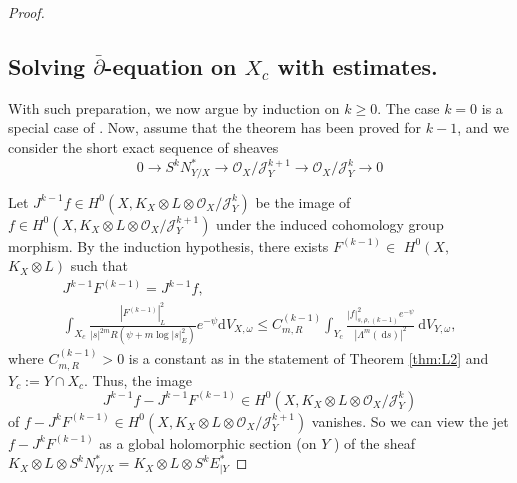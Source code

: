 \documentclass[lang=en,12pt,twoside]{textbook}
\begin{document}
\begin{proof}
\subsection{Solving \texorpdfstring{$\bar{\partial}$}{}-equation on \texorpdfstring{$X_c$}{} with estimates.}

With such preparation, we now argue by {\color{purple} induction on $k \geq 0$}. The case $k=0$ is a special case of \cite[Theorem 1.2]{ZZ18}. Now, {\color{purple} assume that the theorem has been proved for $k-1$}, and we consider the short exact sequence of sheaves
$$
0 \longrightarrow S^k N_{Y / X}^* \longrightarrow \mathcal{O}_X / \mathcal{J}_Y^{k+1} \longrightarrow \mathcal{O}_X / \mathcal{J}_Y^k \longrightarrow 0
$$

Let $J^{k-1} f \in H^0\left(X, K_X \otimes L \otimes \mathcal{O}_X / \mathcal{J}_Y^k\right)$ be the image of $f \in H^0\left(X, K_X \otimes L \otimes \mathcal{O}_X / \mathcal{J}_Y^{k+1}\right)$ under the induced cohomology group morphism. By {\color{purple} the induction hypothesis}, {\color{dblue} there exists $F^{(k-1)} \in$ $H^0\left(X, \right.$ $\left. K_X \otimes L\right)$ such that
{\small\begin{equation}\label{eq:10}
 \begin{gathered}
    J^{k-1} F^{(k-1)}=J^{k-1} f, \\\int_{X_c} \frac{\left|F^{(k-1)}\right|_L^2}{|s|^{2 m} R\left(\psi+m \log |s|_E^2\right)} e^{-\psi}\mathrm{d} V_{X, \omega} \leq C_{m, R}^{(k-1)} \int_{Y_c} \frac{|f|_{s, \rho,(k-1)}^2 e^{-\psi}}{\left|\Lambda^m(\mathrm{~d} s)\right|^2} \mathrm{~d} V_{Y, \omega},
\end{gathered}
\end{equation}}
where $C_{m, R}^{(k-1)}>0$ is a constant as in the statement of Theorem \ref{thm:L2} and $Y_c:=Y \cap X_c$.} Thus, the image $$J^{k-1} f-J^{k-1} F^{(k-1)} \in H^0\left(X, K_X \otimes L \otimes \mathcal{O}_X / \mathcal{J}_Y^k\right)$$ of $f-J^k F^{(k-1)} \in H^0\left(X, K_X \otimes L \otimes \mathcal{O}_X / \mathcal{J}_Y^{k+1}\right)$ vanishes. So we can view the jet $f-J^k F^{(k-1)}$ as a global holomorphic section (on $Y$ ) of the sheaf $K_X \otimes L \otimes S^k N_{Y / X}^*=K_X \otimes L \otimes S^k E_{\mid Y}^*$
\end{proof}
\end{document}
